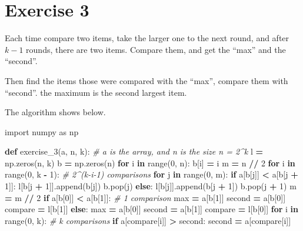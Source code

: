 \documentclass[
]{article}
\newenvironment{Shaded}{\begin{snugshade}}{\end{snugshade}}
\newcommand{\BuiltInTok}[1]{#1}
\newcommand{\CommentTok}[1]{\textcolor[rgb]{0.56,0.35,0.01}{\textit{#1}}}
\newcommand{\ControlFlowTok}[1]{\textcolor[rgb]{0.13,0.29,0.53}{\textbf{#1}}}
\newcommand{\DecValTok}[1]{\textcolor[rgb]{0.00,0.00,0.81}{#1}}
\newcommand{\ImportTok}[1]{#1}
\newcommand{\KeywordTok}[1]{\textcolor[rgb]{0.13,0.29,0.53}{\textbf{#1}}}
\newcommand{\NormalTok}[1]{#1}
\newcommand{\OperatorTok}[1]{\textcolor[rgb]{0.81,0.36,0.00}{\textbf{#1}}}
\begin{document}
\hypertarget{exercise-3}{%
\section{Exercise 3}\label{exercise-3}}

Each time compare two items, take the larger one to the next round, and
after \(k-1\) rounds, there are two items. Compare them, and get the
``max'' and the ``second''.

Then find the items those were compared with the ``max'', compare them
with ``second''. the maximum is the second largest item.

The algorithm shows below.

\begin{Shaded}
\begin{Highlighting}[]
\ImportTok{import}\NormalTok{ numpy }\ImportTok{as}\NormalTok{ np}
  
\KeywordTok{def}\NormalTok{ exercise_3(a, n, k):  }\CommentTok{# a is the array, and n is the size n = 2^k}
\NormalTok{    l }\OperatorTok{=}\NormalTok{ np.zeros(n, k)}
\NormalTok{    b }\OperatorTok{=}\NormalTok{ np.zeros(n)}
    \ControlFlowTok{for}\NormalTok{ i }\KeywordTok{in} \BuiltInTok{range}\NormalTok{(}\DecValTok{0}\NormalTok{, n):}
\NormalTok{        b[i] }\OperatorTok{=}\NormalTok{ i}
\NormalTok{    m }\OperatorTok{=}\NormalTok{ n }\OperatorTok{//} \DecValTok{2}
    \ControlFlowTok{for}\NormalTok{ i }\KeywordTok{in} \BuiltInTok{range}\NormalTok{(}\DecValTok{0}\NormalTok{, k }\OperatorTok{-} \DecValTok{1}\NormalTok{):  }\CommentTok{# 2^(k-i-1) comparisons}
        \ControlFlowTok{for}\NormalTok{ j }\KeywordTok{in} \BuiltInTok{range}\NormalTok{(}\DecValTok{0}\NormalTok{, m):}
            \ControlFlowTok{if}\NormalTok{ a[b[j]] }\OperatorTok{<}\NormalTok{ a[b[j }\OperatorTok{+} \DecValTok{1}\NormalTok{]]:}
\NormalTok{                l[b[j }\OperatorTok{+} \DecValTok{1}\NormalTok{]].append(b[j])}
\NormalTok{                b.pop(j)}
            \ControlFlowTok{else}\NormalTok{:}
\NormalTok{                l[b[j]].append(b[j }\OperatorTok{+} \DecValTok{1}\NormalTok{])}
\NormalTok{                b.pop(j }\OperatorTok{+} \DecValTok{1}\NormalTok{)}
\NormalTok{    m }\OperatorTok{=}\NormalTok{ m }\OperatorTok{//} \DecValTok{2}
    \ControlFlowTok{if}\NormalTok{ a[b[}\DecValTok{0}\NormalTok{]] }\OperatorTok{<}\NormalTok{ a[b[}\DecValTok{1}\NormalTok{]]:  }\CommentTok{# 1 comparison}
        \BuiltInTok{max} \OperatorTok{=}\NormalTok{ a[b[}\DecValTok{1}\NormalTok{]]}
\NormalTok{        second }\OperatorTok{=}\NormalTok{ a[b[}\DecValTok{0}\NormalTok{]]}
\NormalTok{        compare }\OperatorTok{=}\NormalTok{ l[b[}\DecValTok{1}\NormalTok{]]}
    \ControlFlowTok{else}\NormalTok{:}
        \BuiltInTok{max} \OperatorTok{=}\NormalTok{ a[b[}\DecValTok{0}\NormalTok{]]}
\NormalTok{        second }\OperatorTok{=}\NormalTok{ a[b[}\DecValTok{1}\NormalTok{]]}
\NormalTok{        compare }\OperatorTok{=}\NormalTok{ l[b[}\DecValTok{0}\NormalTok{]]}
    \ControlFlowTok{for}\NormalTok{ i }\KeywordTok{in} \BuiltInTok{range}\NormalTok{(}\DecValTok{0}\NormalTok{, k):  }\CommentTok{# k comparisons}
        \ControlFlowTok{if}\NormalTok{ a[compare[i]] }\OperatorTok{>}\NormalTok{ second:}
\NormalTok{            second }\OperatorTok{=}\NormalTok{ a[compare[i]]}
  

\end{Highlighting}
\end{Shaded}
\end{document}

